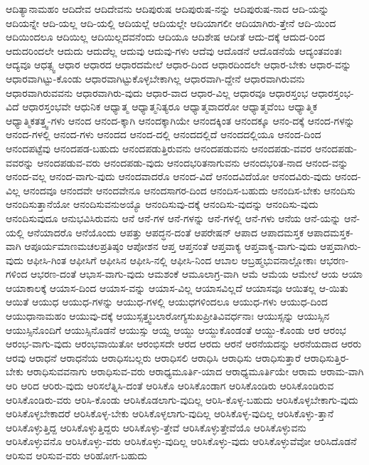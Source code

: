 {ಆದಿತ್ಯಾನಾಮಹಂ
ಆದಿದೇವ
ಆದಿದೇವನು
ಆದಿಪುರುಷ
ಆದಿಪುರುಷ-ನನ್ನು
ಆದಿಪುರುಷ-ನಾದ
ಆದಿ-ಯನ್ನು
ಆದಿಯನ್ನೇ
ಆದಿ-ಯಲ್ಲ
ಆದಿ-ಯಲ್ಲಿ
ಆದಿಯಲ್ಲೆ
ಆದಿಯಲ್ಲೇ
ಆದಿಯಾಗಲೀ
ಆದಿಯಾಗಿರು-ತ್ತೇನೆ
ಆದಿ-ಯಿಂದ
ಆದಿಯಿಂದಲೂ
ಆದಿಯಿಲ್ಲ
ಆದಿಯಿಲ್ಲದವನೆಂದು
ಆದಿಯೂ
ಆದಿಶೇಷ
ಆದೀತೆ
ಆದು-ದಕ್ಕೆ
ಆದುದ-ರಿಂದ
ಆದುದರಿಂದಲೇ
ಆದುದು
ಆದುದೆಲ್ಲ
ಆದುವು
ಆದುವು-ಗಳು
ಆದೆವು
ಆದೊಡನೆ
ಆದೊಡನೆಯೆ
ಆದ್ಯಂತವಂತಃ
ಆದ್ಯವೂ
ಆಧತ್ಸ್ವ
ಆಧಾರ
ಆಧಾರದ
ಆಧಾರದಮೇಲೆ
ಆಧಾರ-ದಿಂದ
ಆಧಾರದಿಂದಲೇ
ಆಧಾರ-ಬೇಕು
ಆಧಾರ-ವನ್ನು
ಆಧಾರವಾಗಿಟ್ಟು-ಕೊಂಡು
ಆಧಾರವಾಗಿಟ್ಟುಕೊಳ್ಳಬೇಕಾಗಿಲ್ಲ
ಆಧಾರವಾಗಿ-ದ್ದೇನೆ
ಆಧಾರವಾಗಿರುವನು
ಆಧಾರವಾಗಿರುವವನು
ಆಧಾರವಾಗಿರು-ವುದು
ಆಧಾರ-ವಾದ
ಆಧಾರ-ವಿಲ್ಲ
ಆಧಾರವೂ
ಆಧಾರಸ್ತಂಭ
ಆಧಾರಸ್ತಂಭ-ವಿದೆ
ಆಧಾರಸ್ತಂಭವೇ
ಆಧುನಿಕ
ಆಧ್ಯಾತ್ಮ
ಆಧ್ಯಾತ್ಮನಿತ್ಯರೂ
ಆಧ್ಯಾತ್ಮವಾದರೋ
ಆಧ್ಯಾತ್ಮವೆಂಬ
ಆಧ್ಯಾತ್ಮಿಕ
ಆಧ್ಯಾತ್ಮಿಕತತ್ತ್ವ-ಗಳು
ಆನಂದ
ಆನಂದ-ಕ್ಕಾಗಿ
ಆನಂದಕ್ಕಾಗಿಯೇ
ಆನಂದಕ್ಕಿಂತ
ಆನಂದಕ್ಕೂ
ಆನಂ-ದಕ್ಕೆ
ಆನಂದ-ಗಳನ್ನು
ಆನಂದ-ಗಳಲ್ಲಿ
ಆನಂದ-ಗಳು
ಆನಂದದ
ಆನಂದ-ದಲ್ಲಿ
ಆನಂದದಲ್ಲಿದೆ
ಆನಂದದಲ್ಲಿಯೂ
ಆನಂದ-ದಿಂದ
ಆನಂದಪಟ್ಟೆವು
ಆನಂದಪಡ-ಬಹುದು
ಆನಂದಪಡುತ್ತಿರುವನು
ಆನಂದಪಡುವನು
ಆನಂದಪಡು-ವವರ
ಆನಂದಪಡು-ವವರನ್ನು
ಆನಂದಪಡುವ-ವರು
ಆನಂದಪಡು-ವುದು
ಆನಂದಭರಿತನಾಗುವನು
ಆನಂದಭರಿತ-ನಾದ
ಆನಂದ-ವನ್ನು
ಆನಂದ-ವಲ್ಲ
ಆನಂದ-ವಾಗು-ವುದು
ಆನಂದವಾದರೊ
ಆನಂದ-ವಿದೆ
ಆನಂದವಿದೆಯೋ
ಆನಂದವಿರು-ವುದು
ಆನಂದ-ವಿಲ್ಲ
ಆನಂದವೂ
ಆನಂದವೇ
ಆನಂದವೇನೂ
ಆನಂದಸಾಗರ-ದಿಂದ
ಆನಂದಿಸ-ಬಹುದು
ಆನಂದಿಸ-ಬೇಕು
ಆನಂದಿಸು
ಆನಂದಿಸುತ್ತಾನೆಯೋ
ಆನಂದಿಸುವನುಅಯ್ಯೊ
ಆನಂದಿಸುವು-ದಕ್ಕೆ
ಆನಂದಿಸು-ವುದನ್ನು
ಆನಂದಿಸು-ವುದು
ಆನಂದಿಸುವುದೂ
ಆನುಭವಿಸಿರುವನು
ಆನೆ
ಆನೆ-ಗಳ
ಆನೆ-ಗಳನ್ನು
ಆನೆ-ಗಳಲ್ಲಿ
ಆನೆ-ಗಳು
ಆನೆಯ
ಆನೆ-ಯನ್ನು
ಆನೆ-ಯಲ್ಲಿ
ಆನೆಯಾದರೊ
ಆನೆಯೊಂದು
ಆಪತ್ತು
ಆಪದ್ಧನ-ದಂತೆ
ಆಪರೇಷನ್
ಆಪಾದ
ಆಪಾದಮಸ್ತಕ
ಆಪಾದಮಸ್ತಕ-ವಾಗಿ
ಆಪೂರ್ಯಮಾಣಮಚಲಪ್ರತಿಷ್ಠಂ
ಆಪೋಶನ
ಆಪ್ತ
ಆಪ್ತನಂತೆ
ಆಪ್ತವಾಕ್ಯ
ಆಪ್ತವಾಕ್ಯ-ವಾಗು-ವುದು
ಆಪ್ತವಾಗಿರು-ವುದು
ಆಫೀಸಿ-ಗಿಂತ
ಆಫೀಸಿಗೆ
ಆಫೀಸಿನ
ಆಫೀಸಿ-ನಲ್ಲಿ
ಆಫೀಸಿ-ನಿಂದ
ಆಬಾಲ
ಆಬ್ರಹ್ಮಭುವನಾಲ್ಲೋಕಾಃ
ಆಭರಣ-ಗಳಿಂದ
ಆಭರಣ-ದಂತೆ
ಆಭಾಸ-ವಾಗು-ವುದು
ಆಮಶಂಕೆ
ಆಮೂಲಾಗ್ರ-ವಾಗಿ
ಆಮೆ
ಆಮೆಯ
ಆಮೇಲೆ
ಆಯ
ಆಯಾ
ಆಯಾಕಾಲಕ್ಕೆ
ಆಯಾಸ-ದಿಂದ
ಆಯಾಸ-ವನ್ನು
ಆಯಾಸ-ವಿಲ್ಲ
ಆಯಾಸವಿಲ್ಲದೆ
ಆಯಾಸವೂ
ಆಯಿತಲ್ಲ
ಆ-ಯಿತು
ಆಯಿತೆ
ಆಯುಧ
ಆಯುಧ-ಗಳನ್ನು
ಆಯುಧ-ಗಳಲ್ಲಿ
ಆಯುಧಗಳಿಂದಲೂ
ಆಯುಧ-ಗಳು
ಆಯುಧ-ದಿಂದ
ಆಯುಧಾನಾಮಹಂ
ಆಯುವು-ದಕ್ಕೆ
ಆಯುಸ್ಸತ್ತ್ವಬಲಾರೋಗ್ಯಸುಖಪ್ರೀತಿವಿವರ್ಧನಾಃ
ಆಯುಸ್ಸನ್ನು
ಆಯುಸ್ಸಿನ
ಆಯುಸ್ಸಿನೊಂದಿಗೆ
ಆಯುಸ್ಸಿನೊಡನೆ
ಆಯುಸ್ಸು
ಆಯ್ದ
ಆಯ್ದು
ಆಯ್ದುಕೊಂಡಂತೆ
ಆಯ್ದು-ಕೊಂಡು
ಆರ
ಆರಂಭ
ಆರಂಭ-ವಾಗು-ವುದು
ಆರಂಭವಾಯಿತೋ
ಆರಂಭಿಸದೇ
ಆರದ
ಆರದು
ಆರನೆ
ಆರನೆಯದನ್ನು
ಆರನೆಯದಾದ
ಆರರು
ಆರವು
ಆರಾಧನೆ
ಆರಾಧನೆಯ
ಆರಾಧಿಸಬಲ್ಲರು
ಆರಾಧಿಸಲಿ
ಆರಾಧಿಸಿ
ಆರಾಧಿಸು
ಆರಾಧಿಸುತ್ತಾರೆ
ಆರಾಧಿಸುತ್ತಿರ-ಬೇಕು
ಆರಾಧಿಸುವವನಾಗು
ಆರಾಧಿಸುವ-ವರು
ಆರಾಧ್ಯಮೂರ್ತಿ-ಯಾದ
ಆರಾಧ್ಯಮೂರ್ತಿಯೇ
ಆರಾಮ
ಆರಾಮ-ವಾಗಿ
ಆರಿ
ಆರಿದ
ಆರಿರು-ವುದು
ಆರಿಸಲೆತ್ನಿಸಿ-ದಂತೆ
ಆರಿಸಿಕೊ
ಆರಿಸಿಕೊಂಡಾಗ
ಆರಿಸಿಕೊಂಡಿರು
ಆರಿಸಿಕೊಂಡಿರುವ
ಆರಿಸಿಕೊಂಡಿರು-ವರು
ಆರಿಸಿ-ಕೊಂಡು
ಆರಿಸಿಕೊಡಲಾಗು-ವುದಿಲ್ಲ
ಆರಿಸಿ-ಕೊಳ್ಳ-ಬಹುದು
ಆರಿಸಿಕೊಳ್ಳಬೇಕಾಗು-ವುದು
ಆರಿಸಿಕೊಳ್ಳಬೇಕಾದರೆ
ಆರಿಸಿಕೊಳ್ಳ-ಬೇಕು
ಆರಿಸಿಕೊಳ್ಳಲಾಗು-ವುದಿಲ್ಲ
ಆರಿಸಿಕೊಳ್ಳ-ವುದಿಲ್ಲ
ಆರಿಸಿಕೊಳ್ಳು-ತ್ತಾನೆ
ಆರಿಸಿಕೊಳ್ಳುತ್ತಿದ್ದ
ಆರಿಸಿಕೊಳ್ಳುತ್ತಿದ್ದರು
ಆರಿಸಿಕೊಳ್ಳು-ತ್ತೇವೆ
ಆರಿಸಿಕೊಳ್ಳುತ್ತೇವೆಯೊ
ಆರಿಸಿಕೊಳ್ಳುವನು
ಆರಿಸಿಕೊಳ್ಳುವನೊ
ಆರಿಸಿಕೊಳ್ಳು-ವರು
ಆರಿಸಿಕೊಳ್ಳು-ವುದಿಲ್ಲ
ಆರಿಸಿಕೊಳ್ಳು-ವುದು
ಆರಿಸಿಕೊಳ್ಳುವೆವೋ
ಆರಿಸಿದೊಡನೆ
ಆರಿಸುವ
ಆರಿಸುವ-ವರು
ಆರಿಹೋಗ-ಬಹುದು
}
